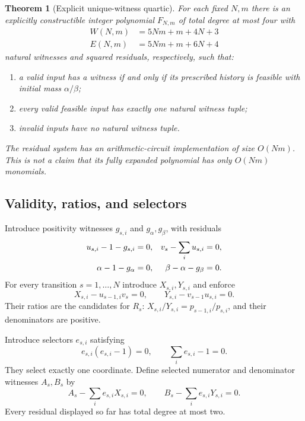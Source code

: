 \documentclass[11pt,letterpaper]{article}
\numberwithin{equation}{section}
\newtheorem{theorem}{Theorem}[section]
\theoremstyle{definition}
\theoremstyle{remark}
\begin{document}
\begin{theorem}[Explicit unique-witness quartic]\label{pqc:thm:singlefold}
For each fixed $N,m$ there is an explicitly constructible integer polynomial
$F_{N,m}$ of total degree at most four with
\begin{align}
 W(N,m)&=5Nm+m+4N+3 \label{pqc:eq:wcount}\\
 E(N,m)&=5Nm+m+6N+4 \label{pqc:eq:ecount}
\end{align}
natural witnesses and squared residuals, respectively, such that:
\begin{enumerate}[label=(\roman*),nosep]
\item a valid input has a witness if and only if its prescribed history is
feasible with initial mass $\alpha/\beta$;
\item every valid feasible input has exactly one natural witness tuple;
\item invalid inputs have no natural witness tuple.
\end{enumerate}
The residual system has an arithmetic-circuit implementation of size
$O(Nm)$. This is not a claim that its fully expanded polynomial has only
$O(Nm)$ monomials.
\end{theorem}

\subsection{Validity, ratios, and selectors}
Introduce positivity witnesses $g_{s,i}$ and $g_\alpha,g_\beta$, with residuals
\begin{align}
 u_{s,i}-1-g_{s,i}&=0,&v_s-\sum_i u_{s,i}&=0,\label{pqc:eq:validres}\\
 \alpha-1-g_\alpha&=0,&\beta-\alpha-g_\beta&=0.\notag
\end{align}
For every transition $s=1,\ldots,N$ introduce $X_{s,i},Y_{s,i}$ and enforce
\begin{equation}\label{pqc:eq:XY}
 X_{s,i}-u_{s-1,i}v_s=0,\qquad
 Y_{s,i}-v_{s-1}u_{s,i}=0.
\end{equation}
Their ratios are the candidates for $R_s$:
$X_{s,i}/Y_{s,i}=p_{s-1,i}/p_{s,i}$, and their denominators are positive.

Introduce selectors $e_{s,i}$ satisfying
\begin{equation}\label{pqc:eq:selector}
 e_{s,i}(e_{s,i}-1)=0,\qquad \sum_i e_{s,i}-1=0.
\end{equation}
They select exactly one coordinate. Define selected numerator and denominator
witnesses $A_s,B_s$ by
\begin{equation}\label{pqc:eq:AB}
 A_s-\sum_i e_{s,i}X_{s,i}=0,\qquad
 B_s-\sum_i e_{s,i}Y_{s,i}=0.
\end{equation}
Every residual displayed so far has total degree at most two.
\end{document}
